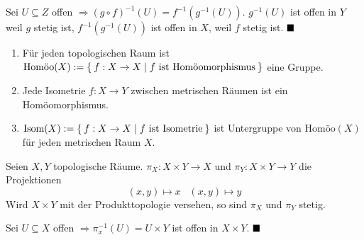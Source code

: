 
\begin{beweis}
    Sei $U \subseteq Z$ offen $\Rightarrow (g \circ f)^{-1} (U) = f^{-1} (g^{-1}(U))$.
    $g^{-1}(U)$ ist offen in $Y$ weil $g$ stetig ist, $f^{-1}(g^{-1}(U))$
    ist offen in $X$, weil $f$ stetig ist. $\qed$
\end{beweis}

\begin{bemerkung}
    \begin{enumerate}[label=\alph*)]
        \item Für jeden topologischen Raum ist 
              $\text{Homöo}(X) := \Set{f: X \rightarrow X | f \text{ ist Homöomorphismus}}$
              eine Gruppe.
        \item Jede Isometrie $f:X \rightarrow Y$ zwischen metrischen 
              Räumen ist ein Homöomorphismus.
        \item $\text{Isom}(X) := \Set{f:X \rightarrow X | f \text{ ist Isometrie}}$ ist
              Untergruppe von $\text{Homöo}(X)$ für jeden metrischen
              Raum $X$.
    \end{enumerate}
\end{bemerkung}

\begin{korollar}
    Seien $X, Y$ topologische Räume. $\pi_X: X \times Y \rightarrow X$
    und $\pi_Y: X \times Y \rightarrow Y$ die Projektionen 
    \[(x,y) \mapsto x \;\;\;(x,y) \mapsto y\]
    Wird $X \times Y$ mit der Produkttopologie versehen, so sind $\pi_X$
    und $\pi_Y$ stetig.
\end{korollar}

\begin{beweis}
    Sei $U \subseteq X$ offen $\Rightarrow \pi_x^{-1} (U) = U \times Y$ 
    ist offen in $X \times Y$. $\qed$
\end{beweis}

